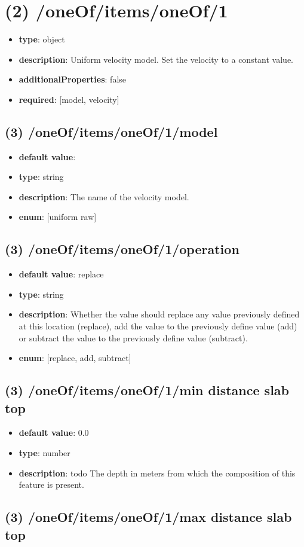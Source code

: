 \section{(2) /oneOf/items/oneOf/1}
\begin{itemize}[leftmargin=2em]\item {\bf type}: object
\item {\bf description}: Uniform velocity model. Set the velocity to a constant value.
\item {\bf additionalProperties}: false
\item {\bf required}: [model, velocity]\end{itemize}
\subsection{(3) /oneOf/items/oneOf/1/model}
\begin{itemize}[leftmargin=3em]\item {\bf default value}: 
\item {\bf type}: string
\item {\bf description}: The name of the velocity model.
\item {\bf enum}: [uniform raw]\end{itemize}\subsection{(3) /oneOf/items/oneOf/1/operation}
\begin{itemize}[leftmargin=3em]\item {\bf default value}: replace
\item {\bf type}: string
\item {\bf description}: Whether the value should replace any value previously defined at this location (replace), add the value to the previously define value (add) or subtract the value to the previously define value (subtract).
\item {\bf enum}: [replace, add, subtract]\end{itemize}\subsection{(3) /oneOf/items/oneOf/1/min distance slab top}
\begin{itemize}[leftmargin=3em]\item {\bf default value}: 0.0
\item {\bf type}: number
\item {\bf description}: todo The depth in meters from which the composition of this feature is present.
\end{itemize}\subsection{(3) /oneOf/items/oneOf/1/max distance slab top}
